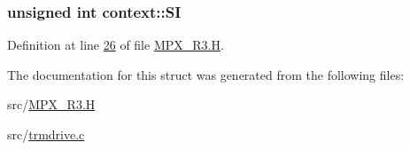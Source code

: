 \hypertarget{structcontext_a6b7fc81c19dfbd3a1438eb7738a712d8}{
\subsubsection[{SI}]{\setlength{\rightskip}{0pt plus 5cm}unsigned int {\bf context::SI}}}
\label{structcontext_a6b7fc81c19dfbd3a1438eb7738a712d8}


Definition at line \hyperlink{_m_p_x___r3_8_h_source_l00026}{26} of file \hyperlink{_m_p_x___r3_8_h_source}{MPX\_\-R3.H}.



The documentation for this struct was generated from the following files:\begin{DoxyCompactItemize}
\item 
src/\hyperlink{_m_p_x___r3_8_h}{MPX\_\-R3.H}\item 
src/\hyperlink{trmdrive_8c}{trmdrive.c}\end{DoxyCompactItemize}
